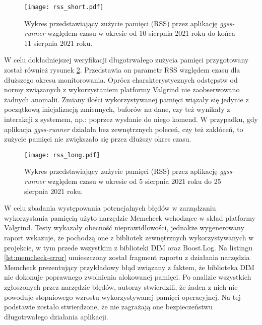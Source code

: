 \clearpage
\begin{figure}[H]
    \centering
    \texttt{[image: rss\_short.pdf]}
    \caption{Wykres przedstawiający zużycie pamięci (RSS) przez aplikację \emph{ggss-runner} względem czasu w okresie od 10 sierpnia 2021 roku do końca 11 sierpnia 2021 roku.}
    \label{fig:rss-short}
\end{figure}

W celu dokładniejszej weryfikacji długotrwałego zużycia pamięci przygotowany został również rysunek \ref{fig:rss-long}. Przedstawia on parametr RSS względem czasu dla dłuższego okresu monitorowania. Oprócz charakterystycznych odstępstw od normy związanych z wykorzystaniem platformy Valgrind nie zaobserwowano żadnych anomalii. Zmiany ilości wykorzystywanej pamięci wiązały się jedynie z początkową inicjalizacją zmiennych, buforów na dane, czy też wynikały z interakcji z systemem, np.: poprzez wysłanie do niego komend. W przypadku, gdy aplikacja \emph{ggss-runner} działała bez zewnętrznych poleceń, czy też zakłóceń, to zużycie pamięci nie zwiększało się przez dłuższy okres czasu.

\begin{figure}[H]
    \centering
    \texttt{[image: rss\_long.pdf]}
    \caption{Wykres przedstawiający zużycie pamięci (RSS) przez aplikację \emph{ggss-runner} względem czasu w okresie od 5 sierpnia 2021 roku do 25 sierpnia 2021 roku.}
    \label{fig:rss-long}
\end{figure}

W celu zbadania występowania potencjalnych błędów w zarządzaniu wykorzystania pamięcią użyto narzędzie Memcheck wchodzące w skład platformy Valgrind. Testy wykazały obecność nieprawidłowości, jednakże wygenerowany raport wskazuje, że pochodzą one z bibliotek zewnętrznych wykorzystywanych w projekcie, w tym przede wszystkim z biblioteki DIM oraz Boost.Log. Na listingu \ref{lst:memcheck-error} umieszczony został fragment raportu z działania narzędzia Memcheck prezentujący przykładowy błąd związany z faktem, że biblioteka DIM nie dokonuje poprawnego zwolnienia alokowanej pamięci. Po analizie wszystkich zgłoszonych przez narzędzie błędów, autorzy stwierdzili, że żaden z nich nie powoduje stopniowego wzrostu wykorzystywanej pamięci operacyjnej. Na tej podstawie zostało stwierdzone, że nie zagrażają one bezpieczeństwu długotrwałego działania aplikacji.

